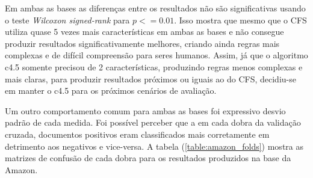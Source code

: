 %

%
%

Em ambas as bases as diferenças entre os resultados não são significativas usando o teste \textit{Wilcoxon signed-rank} para $p <= 0.01$. Isso mostra que mesmo que o CFS utiliza quase 5 vezes mais características em ambas as bases e não consegue produzir resultados significativamente melhores, criando ainda regras mais complexas e de difícil compreensão para seres humanos. Assim, já que o algoritmo c4.5 somente precisou de 2 características, produzindo regras menos complexas e mais claras, para produzir resultados próximos ou iguais ao do CFS, decidiu-se em manter o c4.5 para os próximos cenários de avaliação. 

Um outro comportamento comum para ambas as bases foi expressivo desvio padrão de cada medida. Foi possível perceber que a em cada dobra da validação cruzada, documentos positivos eram classificados mais corretamente em detrimento aos negativos e vice-versa. A tabela (\ref{table:amazon_folds}) mostra as matrizes de confusão de cada dobra para os resultados produzidos na base da Amazon. 


